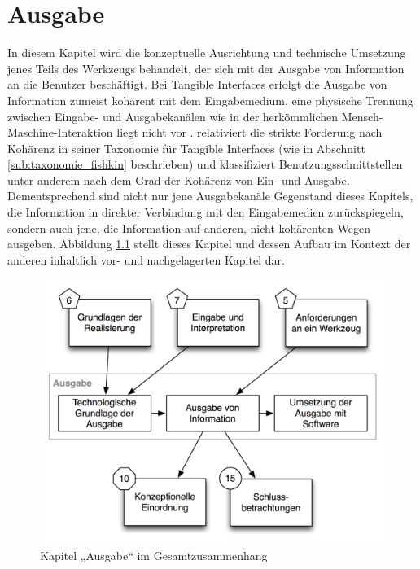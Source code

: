 
\chapter{Ausgabe} %
\label{cha:visualisierung}

In diesem Kapitel wird die konzeptuelle Ausrichtung und technische Umsetzung jenes Teils des Werkzeugs behandelt, der sich mit der Ausgabe von Information an die Benutzer beschäftigt. Bei Tangible Interfaces erfolgt die Ausgabe von Information zumeist kohärent mit dem Eingabemedium, eine physische Trennung zwischen Eingabe- und Ausgabekanälen wie in der herkömmlichen Mensch-Maschine-Interaktion liegt nicht vor \citep{Ullmer00}. \citet{Fishkin04} relativiert die strikte Forderung nach Kohärenz in seiner Taxonomie für Tangible Interfaces (wie in Abschnitt \ref{sub:taxonomie_fishkin} beschrieben) und klassifiziert Benutzungsschnittstellen unter anderem nach dem Grad der Kohärenz von Ein- und Ausgabe. Dementsprechend sind nicht nur jene Ausgabekanäle Gegenstand dieses Kapitels, die Information in direkter Verbindung mit den Eingabemedien zurückspiegeln, sondern auch jene, die Information auf anderen, nicht-kohärenten Wegen ausgeben. Abbildung \ref{fig:img_Kontextgrafiken_k8} stellt dieses Kapitel und dessen Aufbau im Kontext der anderen inhaltlich vor- und nachgelagerten Kapitel dar.

\begin{figure}[htbp]
	\centering
		\includegraphics[scale=0.6]{img/Kontextgrafiken/k8.png}
	\caption{Kapitel „Ausgabe“ im Gesamtzusammenhang}
	\label{fig:img_Kontextgrafiken_k8}
\end{figure}

